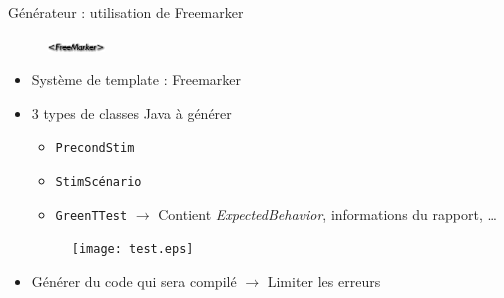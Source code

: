 \documentclass{beamer}
\begin{document}
\begin{frame}{Générateur : utilisation de Freemarker}
	~
	\begin{figure}
		\includegraphics[width=1.5cm]{FreeMaker.png}
	\end{figure}
	\vspace{-30px}
	\begin{itemize}
		\item Système de template : Freemarker
			\vfill
			\pause
		\item 3 types de classes Java à générer
		\begin{itemize}
			\item \texttt{PrecondStim}
			\item \texttt{StimScénario}
			\item \texttt{GreenTTest} $\rightarrow$ Contient \textit{ExpectedBehavior}, informations du rapport, \ldots
		\end{itemize}
		\begin{figure}[H]
			\centering
			\texttt{[image: test.eps]}
		\end{figure}
			\vfill
		\pause
		\item Générer du code qui sera compilé\newline
			$\rightarrow$ Limiter les erreurs
	\end{itemize}
\end{frame}
\end{document}
